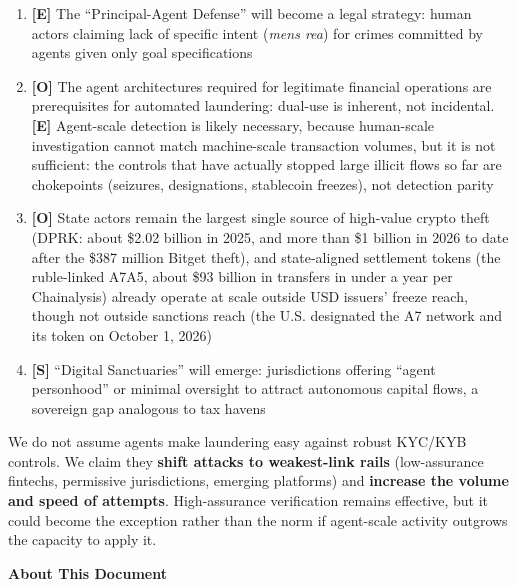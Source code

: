 \documentclass[11pt,letterpaper]{article}
\begin{document}
\begin{keybox}
\begin{enumerate}
  \item \textbf{[E]} The ``Principal-Agent Defense'' will become a legal strategy: human actors claiming lack of specific intent (\textit{mens rea}) for crimes committed by agents given only goal specifications
  \item \textbf{[O]} The agent architectures required for legitimate financial operations are prerequisites for automated laundering: dual-use is inherent, not incidental. \textbf{[E]} Agent-scale detection is likely necessary, because human-scale investigation cannot match machine-scale transaction volumes, but it is not sufficient: the controls that have actually stopped large illicit flows so far are chokepoints (seizures, designations, stablecoin freezes), not detection parity
  \item \textbf{[O]} State actors remain the largest single source of high-value crypto theft (DPRK: about \$2.02 billion in 2025, and more than \$1 billion in 2026 to date after the \$387 million Bitget theft), and state-aligned settlement tokens (the ruble-linked A7A5, about \$93 billion in transfers in under a year per Chainalysis) already operate at scale outside USD issuers' freeze reach, though not outside sanctions reach (the U.S. designated the A7 network and its token on October 1, 2026)
  \item \textbf{[S]} ``Digital Sanctuaries'' will emerge: jurisdictions offering ``agent personhood'' or minimal oversight to attract autonomous capital flows, a sovereign gap analogous to tax havens
\end{enumerate}
\end{keybox}

\vspace{0.15cm}

\begin{infobox}
We do not assume agents make laundering easy against robust KYC/KYB controls. We claim they \textbf{shift attacks to weakest-link rails} (low-assurance fintechs, permissive jurisdictions, emerging platforms) and \textbf{increase the volume and speed of attempts}. High-assurance verification remains effective, but it could become the exception rather than the norm if agent-scale activity outgrows the capacity to apply it.
\end{infobox}

\newpage
\thispagestyle{empty}
\begin{center}
{\color{forestdark}\Large\bfseries About This Document}
\end{center}
\end{document}

